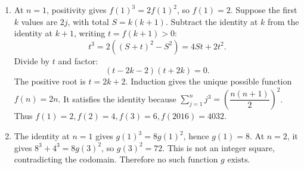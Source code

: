 \begin{enumerate}
\item At $n=1$, positivity gives $f(1)^3=2f(1)^2$, so $f(1)=2$. Suppose the first $k$ values are $2j$, with total $S=k(k+1)$. Subtract the identity at $k$ from the identity at $k+1$, writing $t=f(k+1)>0$:
\[
t^3=2((S+t)^2-S^2)=4St+2t^2.
\]
Divide by $t$ and factor:
\[
(t-2k-2)(t+2k)=0.
\]
The positive root is $t=2k+2$. Induction gives the unique possible function $f(n)=2n$. It satisfies the identity because $\sum_{j=1}^n j^3=(\dfrac{n(n+1)}{2})^2$. Thus $\boxed{f(1)=2,f(2)=4,f(3)=6,f(2016)=4032}$.
\item The identity at $n=1$ gives $g(1)^3=8g(1)^2$, hence $g(1)=8$. At $n=2$, it gives $8^3+4^3=8g(3)^2$, so $g(3)^2=72$. This is not an integer square, contradicting the codomain. Therefore $\boxed{\text{no such function }g\text{ exists}}$.
\end{enumerate}
